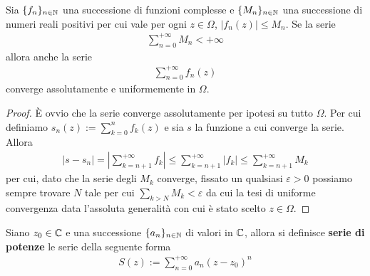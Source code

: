 \begin{theorem}
	\label{thr:m-test-weierstrass} Sia $\{f_n\}_{n\in\mathbb{N}}$ una successione di funzioni complesse e $\{M_n\}_{n\in\mathbb{N}}$ una successione di numeri reali positivi per cui vale per ogni $z\in \Omega$, $|f_n(z)| \le M_n$. Se la serie 
	\begin{equation}
	\begin{aligned}
		\sum_{n=0}^{+\infty} M_n < +\infty
	\end{aligned}
	\end{equation} 
	allora anche la serie 
	\begin{equation}
	\begin{aligned}
		\sum_{n=0}^{+\infty} f_n(z)
	\end{aligned}
	\end{equation}
	converge assolutamente e uniformemente in $\Omega$.
\end{theorem}
\begin{proof}
	È ovvio che la serie converge assolutamente per ipotesi su tutto $\Omega$. Per cui definiamo $s_n(z) := \sum_{k=0}^n f_k(z)$ e sia $s$ la funzione a cui converge la serie. Allora
	\begin{equation}
	\begin{aligned}
		|s - s_n| = \left|\sum_{k=n+1}^{+\infty} f_k\right| \le \sum_{k=n+1}^{+\infty} \left|f_k\right| \le \sum_{k=n+1}^{+\infty} M_k
	\end{aligned}
	\end{equation}
	per cui, dato che la serie degli $M_k$ converge, fissato un qualsiasi $\varepsilon > 0$ possiamo sempre trovare $N$ tale per cui $\sum_{k>N} M_k < \varepsilon$ da cui la tesi di uniforme convergenza data l'assoluta generalità con cui è stato scelto $z \in \Omega$. 
\end{proof}

\begin{definition}
	\label{defn:serie-di-potenze}
	Siano $z_0 \in \mathbb{C}$ e una successione $\{a_n\}_{n\in \mathbb{N}}$ di valori in $\mathbb{C}$, allora si definisce \textbf{serie di potenze} le serie della seguente forma
	\begin{equation}
	\begin{aligned}
		S(z) := \sum_{n=0}^{+\infty} a_n(z-z_0)^n
	\end{aligned}
	\end{equation}
\end{definition}

